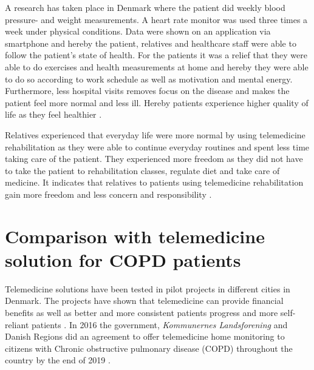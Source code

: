 A research has taken place in Denmark where the patient did weekly blood pressure- and weight measurements. A heart rate monitor was used three times a week under physical conditions. Data were shown on an application via smartphone and hereby the patient, relatives and healthcare staff were able to follow the patient’s state of health. For the patients it was a relief that they were able to do exercises and health measurements at home and hereby they were able to do so according to work schedule as well as motivation and mental energy. Furthermore, less hospital visits removes focus on the disease and makes the patient feel more normal and less ill. Hereby patients experience higher quality of life as they feel healthier \cite{Bregendahl_2016}.  

Relatives experienced that everyday life were more normal by using telemedicine rehabilitation as they were able to continue everyday routines and spent less time taking care of the patient. They experienced more freedom as they did not have to take the patient to rehabilitation classes, regulate diet and take care of medicine. It indicates that relatives to patients using telemedicine rehabilitation gain more freedom and less concern and responsibility \cite{7}.  

   
\section{Comparison with telemedicine solution for COPD patients}

Telemedicine solutions have been tested in pilot projects in different cities in Denmark. The projects have shown that telemedicine can provide financial benefits as well as better and more consistent patients progress and more self-reliant patients \cite{KOL_1}. In 2016 the government, \textit{Kommunernes Landsforening} and Danish Regions did an agreement to offer telemedicine home monitoring to citizens with Chronic obstructive pulmonary disease (COPD) throughout the country by the end of 2019 \cite{KOL_2}. 

